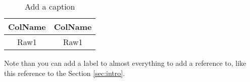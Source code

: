 \begin{table}[htb]
    \centering
    \begin{tabular}{| c | c |}
    \hline
         ColName & ColName  \\
         \hline
         Raw1 & Raw1 \\
         \hline
    \end{tabular}
    \caption{Add a caption }
    \label{tab:tinytab}
\end{table}

Note than you can add a label to almost everything to add a reference to, like this reference to the Section \ref{sec:intro}.